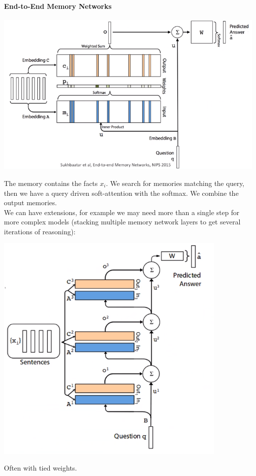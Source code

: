 \documentclass[10pt]{report}
\begin{document}
\paragraph{End-to-End Memory Networks}
\begin{center}
	\includegraphics[scale=0.75]{128.png}
\end{center}
The memory contains the facts $x_i$. We search for memories matching the query, then we have a query driven soft-attention with the softmax. We combine the output memories.\\
We can have extensions, for example we may need more than a single step for more complex models (stacking multiple memory network layers to get several iterations of reasoning):
\begin{center}
	\includegraphics[scale=0.5]{129.png}
\end{center}
Often with tied weights.
\end{document}
